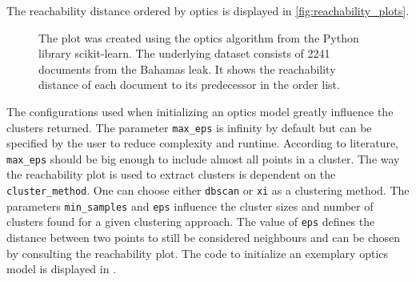 The reachability distance ordered by \ac{optics} is displayed in \autoref{fig:reachability_plots}.

\begin{figure}[!htb]%
    \centering
    \qquad
    \caption[Reachability distances]{The plot was created using the \ac{optics} algorithm from the Python library scikit-learn.
    The underlying dataset consists of 2241 documents from the Bahamas leak.
    It shows the reachability distance of each document to its predecessor in the order list.}%
    \label{fig:reachability_plots}%
\end{figure}

The configurations used when initializing an \ac{optics} model greatly influence the clusters returned.
The parameter \texttt{max\_eps} is infinity by default but can be specified by the user to reduce complexity and runtime.
According to literature, \texttt{max\_eps} should be big enough to include almost all points in a cluster.
The way the reachability plot is used to extract clusters is dependent on the \texttt{cluster\_method}. 
One can choose either \texttt{dbscan} or \texttt{xi} as a clustering method.
The parameters \texttt{min\_samples} and \texttt{eps} influence the cluster sizes and number of clusters found for a given clustering approach.
The value of \texttt{eps} defines the distance between two points to still be considered neighbours 
and can be chosen by consulting the reachability plot.
The code to initialize an exemplary \ac{optics} model is displayed in .

